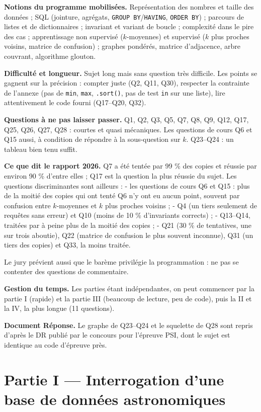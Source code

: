 \documentclass[11pt,a4paper]{article}
\begin{document}
\textbf{Notions du programme mobilisées.} Représentation des nombres et taille des données ; SQL (jointure, agrégats, \texttt{GROUP\ BY}/\texttt{HAVING}, \texttt{ORDER\ BY}) ; parcours de listes et de dictionnaires ; invariant et variant de boucle ; complexité dans le pire des cas ; apprentissage non supervisé (\(k\)-moyennes) et supervisé (\(k\) plus proches voisins, matrice de confusion) ; graphes pondérés, matrice d'adjacence, arbre couvrant, algorithme glouton.

\textbf{Difficulté et longueur.} Sujet long mais sans question très difficile. Les points se gagnent sur la précision : compter juste (Q2, Q11, Q30), respecter la contrainte de l'annexe (pas de \texttt{min}, \texttt{max}, \texttt{.sort()}, pas de test \texttt{in} sur une liste), lire attentivement le code fourni (Q17--Q20, Q32).

\textbf{Questions à ne pas laisser passer.} Q1, Q2, Q3, Q5, Q7, Q8, Q9, Q12, Q17, Q25, Q26, Q27, Q28 : courtes et quasi mécaniques. Les questions de cours Q6 et Q15 aussi, à condition de répondre à la sous-question sur \(k\). Q23--Q24 : un tableau bien tenu suffit.

\textbf{Ce que dit le rapport 2026.} Q7 a été tentée par 99 \% des copies et réussie par environ 90 \% d'entre elles ; Q17 est la question la plus réussie du sujet. Les questions discriminantes sont ailleurs :
- les questions de cours Q6 et Q15 : plus de la moitié des copies qui ont tenté Q6 n'y ont eu aucun point, souvent par confusion entre \(k\)-moyennes et \(k\) plus proches voisins ;
- Q4 (un tiers seulement de requêtes sans erreur) et Q10 (moins de 10 \% d'invariants corrects) ;
- Q13--Q14, traitées par à peine plus de la moitié des copies ;
- Q21 (30 \% de tentatives, une sur trois aboutie), Q22 (matrice de confusion le plus souvent inconnue), Q31 (un tiers des copies) et Q33, la moins traitée.

Le jury prévient aussi que le barème privilégie la programmation : ne pas se contenter des questions de commentaire.

\textbf{Gestion du temps.} Les parties étant indépendantes, on peut commencer par la partie I (rapide) et la partie III (beaucoup de lecture, peu de code), puis la II et la IV, la plus longue (11 questions).

\textbf{Document Réponse.} Le graphe de Q23--Q24 et le squelette de Q28 sont repris d'après le DR publié par le concours pour l'épreuve PSI, dont le sujet est identique au code d'épreuve près.

\hypertarget{partie-i-interrogation-dune-base-de-donnuxe9es-astronomiques}{%
\section{Partie I --- Interrogation d'une base de données astronomiques}\label{partie-i-interrogation-dune-base-de-donnuxe9es-astronomiques}}
\end{document}
